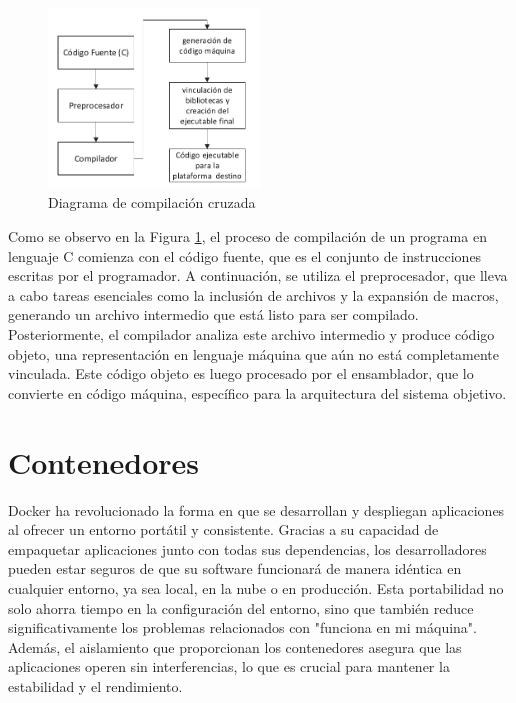 \begin{figure}[h!]
    \centering
    \includegraphics[width=0.5\textwidth]{fig/teorico/Flujo de trabajo xcompiler.pdf}
    \caption{Diagrama de compilación cruzada}
    \label{fig:xcompile_workflow}
\end{figure}

Como se observo en la Figura \ref{fig:xcompile_workflow}, el proceso de compilación de un programa en lenguaje C comienza con el código fuente, que es el conjunto de instrucciones escritas por el programador. A continuación, se utiliza el preprocesador, que lleva a cabo tareas esenciales como la inclusión de archivos y la expansión de macros, generando un archivo intermedio que está listo para ser compilado. Posteriormente, el compilador analiza este archivo intermedio y produce código objeto, una representación en lenguaje máquina que aún no está completamente vinculada. Este código objeto es luego procesado por el ensamblador, que lo convierte en código máquina, específico para la arquitectura del sistema objetivo.

\section{Contenedores}\label{sec:containers}

Docker ha revolucionado la forma en que se desarrollan y despliegan aplicaciones al ofrecer un entorno portátil y consistente. Gracias a su capacidad de empaquetar aplicaciones junto con todas sus dependencias, los desarrolladores pueden estar seguros de que su software funcionará de manera idéntica en cualquier entorno, ya sea local, en la nube o en producción. Esta portabilidad no solo ahorra tiempo en la configuración del entorno, sino que también reduce significativamente los problemas relacionados con "funciona en mi máquina". Además, el aislamiento que proporcionan los contenedores asegura que las aplicaciones operen sin interferencias, lo que es crucial para mantener la estabilidad y el rendimiento.

